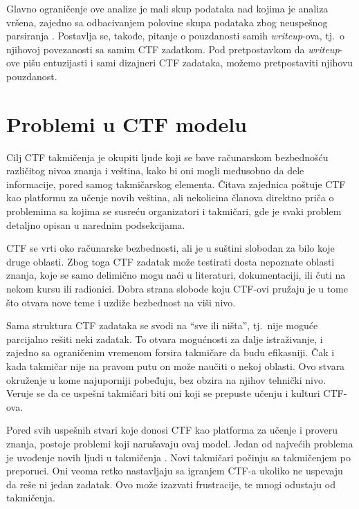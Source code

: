 \documentclass[12pt, a4paper, twocolumn]{article}
\begin{document}
Glavno ograničenje ove analize je mali skup podataka nad kojima je analiza 
vršena, zajedno sa odbacivanjem polovine skupa podataka zbog neuspešnog 
parsiranja \cite{ctf_skills}. Postavlja se, takođe, pitanje o pouzdanosti 
samih \emph{writeup}-ova, tj.\ o njihovoj povezanosti sa samim CTF zadatkom. 
Pod pretpostavkom da \emph{writeup}-ove pišu entuzijasti i sami dizajneri CTF 
zadataka, možemo pretpostaviti njihovu pouzdanost.

\section{Problemi u CTF modelu}

Cilj CTF takmičenja je okupiti ljude koji se bave računarskom bezbednošću
različitog nivoa znanja i veština, kako bi oni mogli međusobno da dele
informacije, pored samog takmičarskog elementa. Čitava zajednica poštuje
CTF kao platformu za učenje novih veština, ali nekolicina članova direktno
priča o problemima sa kojima se susreću organizatori i takmičari, gde je svaki
problem detaljno opisan u narednim podsekcijama.

CTF se vrti oko računarske bezbednosti, ali je u suštini slobodan za bilo koje
druge oblasti. Zbog toga CTF zadatak može testirati dosta nepoznate oblasti 
znanja, koje se samo delimično mogu naći u literaturi, dokumentaciji, ili čuti 
na nekom kursu ili radionici. Dobra strana slobode koju CTF-ovi pružaju je u 
tome što otvara nove teme i uzdiže bezbednost na viši nivo. 

Sama struktura CTF zadataka se svodi na ``sve ili ništa'', tj.\ nije moguće
parcijalno rešiti neki zadatak. To otvara mogućnosti za dalje istraživanje, i
zajedno sa ograničenim vremenom forsira takmičare da budu efikasniji. Čak i
kada takmičar nije na pravom putu on može naučiti o nekoj oblasti. Ovo stvara
okruženje u kome najuporniji pobeđuju, bez obzira na njihov tehnički nivo.
Veruje se da ce uspešni takmičari biti oni koji se prepuste učenju i kulturi
CTF-ova.

Pored svih uspešnih stvari koje donosi CTF kao platforma za učenje i proveru
znanja, postoje problemi koji narušavaju ovaj model. Jedan od najvećih
problema je uvođenje novih ljudi u takmičenja \cite{ctf_chung}. Novi takmičari
počinju sa takmičenjem po preporuci. Oni veoma retko nastavljaju sa igranjem
CTF-a ukoliko ne uspevaju da reše ni jedan zadatak. Ovo može izazvati 
frustracije, te mnogi odustaju od takmičenja.
\end{document}
